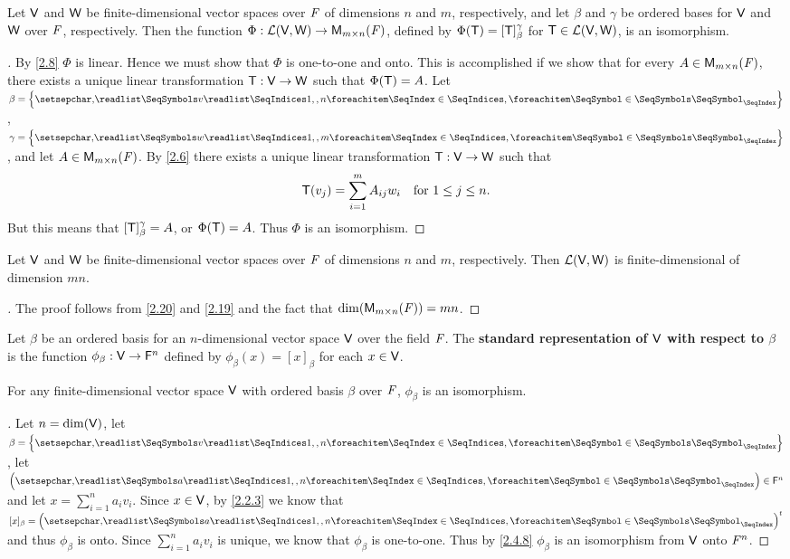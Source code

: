 \begin{thm}\label{2.20}
  Let \(\mathsf{V}\) and \(\mathsf{W}\) be finite-dimensional vector spaces over \(\mathit{F}\) of dimensions \(n\) and \(m\), respectively, and let \(\beta\) and \(\gamma\) be ordered bases for \(\mathsf{V}\) and \(\mathsf{W}\) over \(\mathit{F}\), respectively.
  Then the function \(\Phi : \mathcal{L}(\mathsf{V}, \mathsf{W}) \to \mathsf{M}_{{m} \times n}({\mathit{F}})\), defined by \(\Phi(\mathsf{T}) = [\mathsf{T}]_{\beta}^{\gamma}\) for \(\mathsf{T} \in \mathcal{L}(\mathsf{V}, \mathsf{W})\), is an isomorphism.
\end{thm}

\begin{proof}[]
  By \cref{2.8} \(\Phi\) is linear.
  Hence we must show that \(\Phi\) is one-to-one and onto.
  This is accomplished if we show that for every \(A \in \mathsf{M}_{{m} \times n}({\mathit{F}})\), there exists a unique linear transformation \(\mathsf{T} : \mathsf{V} \to \mathsf{W}\) such that \(\Phi(\mathsf{T}) = A\).
  Let \(\beta = \set{\seq{v}{1,,n}}\), \(\gamma = \set{\seq{w}{1,,m}}\), and let \(A \in \mathsf{M}_{{m} \times n}({\mathit{F}})\).
  By \cref{2.6} there exists a unique linear transformation \(\mathsf{T} : \mathsf{V} \to \mathsf{W}\) such that
  \[
    \mathsf{T}(v_j) = \sum_{i = 1}^m A_{i j} w_i \quad \text{for } 1 \leq j \leq n.
  \]
  But this means that \([\mathsf{T}]_{\beta}^{\gamma} = A\), or \(\Phi(\mathsf{T}) = A\).
  Thus \(\Phi\) is an isomorphism.
\end{proof}

\begin{cor}\label{2.4.10}
  Let \(\mathsf{V}\) and \(\mathsf{W}\) be finite-dimensional vector spaces over \(\mathit{F}\) of dimensions \(n\) and \(m\), respectively.
  Then \(\mathcal{L}(\mathsf{V}, \mathsf{W})\) is finite-dimensional of dimension \(mn\).
\end{cor}

\begin{proof}[]
  The proof follows from \cref{2.20} and \cref{2.19} and the fact that \(\dim(\mathsf{M}_{{m} \times n}({\mathit{F}})) = mn\).
\end{proof}

\begin{defn}\label{2.4.11}
  Let \(\beta\) be an ordered basis for an \(n\)-dimensional vector space \(\mathsf{V}\) over the field \(\mathit{F}\).
  The \textbf{standard representation of \(\mathsf{V}\) with respect to \(\beta\)} is the function \(\phi_{\beta} : \mathsf{V} \to \mathsf{F}^n\) defined by \(\phi_{\beta}(x) = [x]_{\beta}\) for each \(x \in \mathsf{V}\).
\end{defn}

\begin{thm}\label{2.21}
  For any finite-dimensional vector space \(\mathsf{V}\) with ordered basis \(\beta\) over \(\mathit{F}\), \(\phi_{\beta}\) is an isomorphism.
\end{thm}

\begin{proof}[]
  Let \(n = \dim(\mathsf{V})\), let \(\beta = \set{\seq{v}{1,,n}}\), let \(\tuple{a}{1,,n} \in \vs{F}^n\) and let \(x = \sum_{i = 1}^n a_i v_i\).
  Since \(x \in \mathsf{V}\), by \cref{2.2.3} we know that \([x]_{\beta} = \tp{\tuple{a}{1,,n}}\) and thus \(\phi_{\beta}\) is onto.
  Since \(\sum_{i = 1}^n a_i v_i\) is unique, we know that \(\phi_{\beta}\) is one-to-one.
  Thus by \cref{2.4.8} \(\phi_{\beta}\) is an isomorphism from \(\mathsf{V}\) onto \(\mathsf{\mathit{F}}^n\).
\end{proof}
